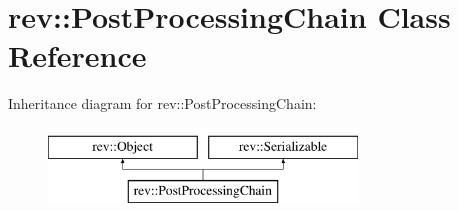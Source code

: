 \hypertarget{classrev_1_1_post_processing_chain}{}\section{rev\+::Post\+Processing\+Chain Class Reference}
\label{classrev_1_1_post_processing_chain}
Inheritance diagram for rev\+::Post\+Processing\+Chain\+:\begin{figure}[H]
\begin{center}
\leavevmode
\includegraphics[height=2.000000cm]{classrev_1_1_post_processing_chain}
\end{center}
\end{figure}
